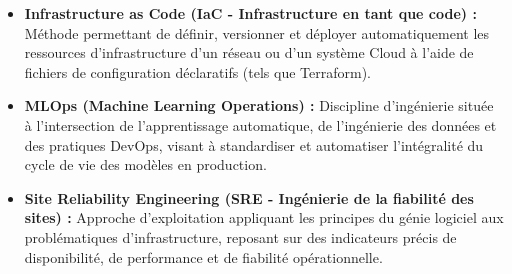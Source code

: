 \begin{itemize}
    \item[$\bullet$] \textbf{Infrastructure as Code (IaC - Infrastructure en tant que code) :} Méthode permettant de définir, versionner et déployer automatiquement les ressources d'infrastructure d'un réseau ou d'un système Cloud à l'aide de fichiers de configuration déclaratifs (tels que Terraform). %
    \item[$\bullet$] \textbf{MLOps (Machine Learning Operations) :} Discipline d'ingénierie située à l'intersection de l'apprentissage automatique, de l'ingénierie des données et des pratiques DevOps, visant à standardiser et automatiser l'intégralité du cycle de vie des modèles en production. %
    \item[$\bullet$] \textbf{Site Reliability Engineering (SRE - Ingénierie de la fiabilité des sites) :} Approche d'exploitation appliquant les principes du génie logiciel aux problématiques d'infrastructure, reposant sur des indicateurs précis de disponibilité, de performance et de fiabilité opérationnelle. %
\end{itemize}

\clearpage